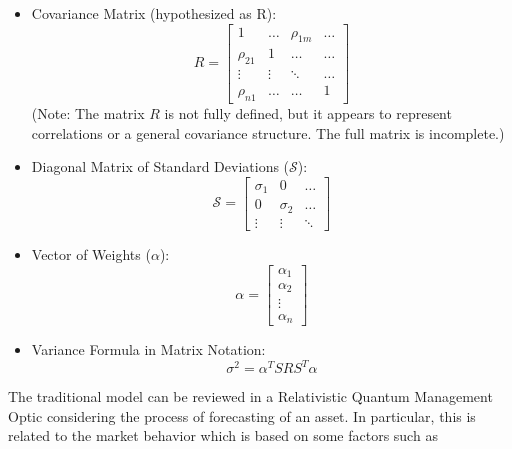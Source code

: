\documentclass{article}
\begin{document}
\begin{itemize}
    \item Covariance Matrix (hypothesized as R):
    $$R=\begin{bmatrix}1 & \dots & \rho_{1m} & \dots \\ \rho_{21} & 1 & \dots & \dots \\ \vdots & \vdots & \ddots & \dots \\ \rho_{n1} & \dots & \dots & 1\end{bmatrix}$$
    (Note: The matrix $R$ is not fully defined, but it appears to represent correlations or a general covariance structure. The full matrix is incomplete.)

    \item Diagonal Matrix of Standard Deviations ($\mathcal{S}$):
    $$\mathcal{S}=\begin{bmatrix}\sigma_{1} & 0 & \dots \\ 0 & \sigma_{2} & \dots \\ \vdots & \vdots & \ddots \end{bmatrix}$$

    \item Vector of Weights ($\alpha$):
    $$\alpha=\begin{bmatrix}\alpha_{1}\\ \alpha_{2}\\ \vdots \\ \alpha_{n}\end{bmatrix}$$
    
    \item Variance Formula in Matrix Notation:
    $$\sigma^{2}=\alpha^{T}S R S^{T}\alpha$$
\end{itemize}
The traditional model can be reviewed in a Relativistic Quantum Management Optic considering the process of forecasting of an asset.
In particular, this is related to the market behavior which is based on some factors such as 
\end{document}

